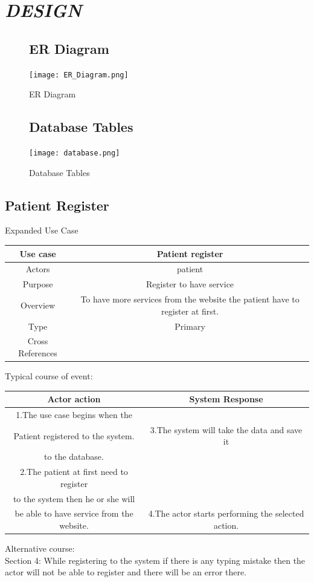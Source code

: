 \documentclass[14pt,a4paper,calibribody]{article}
\begin{document}
\section{\emph{\large{DESIGN}}}
\begin{figure}[h]
\subsection{ER Diagram}
\begin{center}
\texttt{[image: ER\_Diagram.png]}
\caption{ER Diagram}
\end{center}
\subsection{Database Tables}
\begin{center}
\texttt{[image: database.png]}
\caption{Database Tables}
\end{center}
\end{figure}
\clearpage
\subsection{Patient Register}
Expanded Use Case
\begin{center}
\begin{tabular}{ |c| c| }
\hline
Use case & Patient register  \\ 
\hline
Actors & patient \\  
\hline
Purpose & Register to have service \\ 
\hline
Overview & To have more services from the website the patient have to register at first. \\ 
\hline
Type & Primary  \\ 
\hline
Cross References&  \\ 
\hline
\end{tabular}
\end{center}
Typical course of event:

\begin{center}
\begin{tabular}{ |c| c| }
\hline
Actor action & System Response \\ 
\hline
1.The use case begins when the\\Patient registered to the system.
& 3.The system will take the data and save it \\ to the database.\\  
\hline
2.The patient at first need to register \\ to the system then he or she will \\ be able to have service from the website. & 4.The actor starts performing
the selected action. \\   
\hline
\end{tabular}
\end{center}
Alternative course:\\
Section 4: While registering to the system if there is any typing mistake then the actor will not be able to register and there will be an error there.
\end{document}

